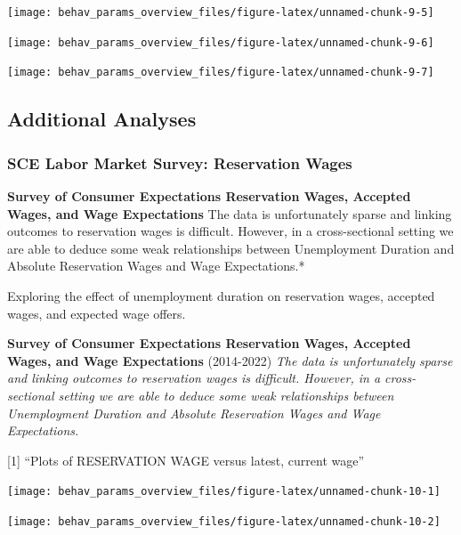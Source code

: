 \documentclass[
]{article}
\begin{document}
\begin{center}\texttt{[image: behav\_params\_overview\_files/figure-latex/unnamed-chunk-9-5]} \end{center}

\begin{center}\texttt{[image: behav\_params\_overview\_files/figure-latex/unnamed-chunk-9-6]} \end{center}

\begin{center}\texttt{[image: behav\_params\_overview\_files/figure-latex/unnamed-chunk-9-7]} \end{center}

\subsection{Additional Analyses}\label{additional-analyses}

\subsubsection{SCE Labor Market Survey: Reservation
Wages}\label{sce-labor-market-survey-reservation-wages}

\textbf{Survey of Consumer Expectations Reservation Wages, Accepted
Wages, and Wage Expectations} The data is unfortunately sparse and
linking outcomes to reservation wages is difficult. However, in a
cross-sectional setting we are able to deduce some weak relationships
between Unemployment Duration and Absolute Reservation Wages and Wage
Expectations.*

Exploring the effect of unemployment duration on reservation wages,
accepted wages, and expected wage offers.

\textbf{Survey of Consumer Expectations Reservation Wages, Accepted
Wages, and Wage Expectations} (2014-2022) \emph{The data is
unfortunately sparse and linking outcomes to reservation wages is
difficult. However, in a cross-sectional setting we are able to deduce
some weak relationships between Unemployment Duration and Absolute
Reservation Wages and Wage Expectations.}

{[}1{]} ``Plots of RESERVATION WAGE versus latest, current wage''

\begin{center}\texttt{[image: behav\_params\_overview\_files/figure-latex/unnamed-chunk-10-1]} \end{center}

\begin{center}\texttt{[image: behav\_params\_overview\_files/figure-latex/unnamed-chunk-10-2]} \end{center}
\end{document}
